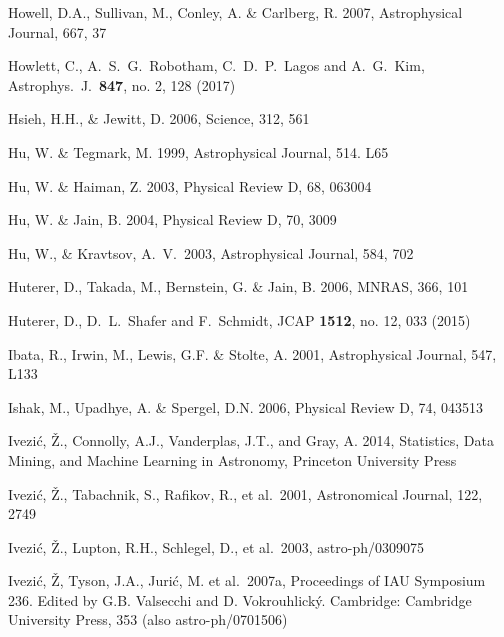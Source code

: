 \documentclass[twocolumn]{aastex61}
\begin{document}
\begin{thebibliography}{}
 Howell, D.A., Sullivan, M., Conley, A. \& Carlberg, R. 2007, Astrophysical Journal, 667, 37

 Howlett, C., A.~S.~G.~Robotham, C.~D.~P.~Lagos and A.~G.~Kim, Astrophys.\ J.\  {\bf 847}, no. 2, 128 (2017)

 Hsieh, H.H., \& Jewitt, D. 2006, Science, 312, 561

 Hu, W. \& Tegmark, M. 1999, Astrophysical Journal, 514. L65

 Hu, W. \& Haiman, Z. 2003, Physical Review D, 68, 063004

 Hu, W. \& Jain, B. 2004, Physical Review D, 70, 3009

 Hu, W., \& Kravtsov, A.~V.\ 2003, Astrophysical Journal, 584, 702

 Huterer, D., Takada, M., Bernstein, G. \& Jain, B. 2006, MNRAS, 366, 101

 Huterer, D., D.~L.~Shafer and F.~Schmidt, JCAP {\bf 1512}, no. 12, 033 (2015)

 Ibata, R., Irwin, M., Lewis, G.F. \& Stolte, A. 2001, Astrophysical Journal, 547, L133

 Ishak, M., Upadhye, A. \& Spergel, D.N. 2006, Physical Review D, 74, 043513

 Ivezi\'c, \v Z., Connolly, A.J., Vanderplas, J.T., and Gray, A. 2014, Statistics, Data Mining, and Machine Learning in Astronomy, Princeton University Press

 Ivezi\'{c}, \v{Z}., Tabachnik, S., Rafikov, R., et al.~2001, Astronomical Journal, 122, 2749

 Ivezi\'c, \v Z., Lupton, R.H., Schlegel, D., et al.~2003, astro-ph/0309075

 Ivezi\'{c}, \v{Z}, Tyson, J.A., Juri\'{c}, M. et al.~2007a, Proceedings of IAU Symposium 236. Edited by G.B. Valsecchi and D. Vokrouhlick\'{y}. Cambridge: Cambridge University Press, 353 (also astro-ph/0701506)


\end{thebibliography}
\end{document}
